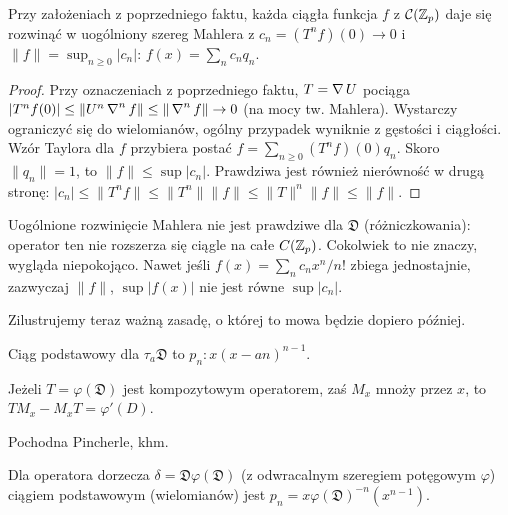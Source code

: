 \begin{fakt}
	Przy założeniach z poprzedniego faktu, każda ciągła funkcja $f$ z $\mathcal C(\mathbb Z_p)$ daje się rozwinąć w uogólniony szereg Mahlera z $c_n = (T^n f)(0) \to 0$ i $\|f\| = \sup_{n \ge 0} |c_n|$:
	$
		f(x) = \sum_{n} c_nq_n.
	$
\end{fakt}

\begin{proof}
	Przy oznaczeniach z poprzedniego faktu, $T = \operatorname{\nabla} U$ pociąga $|T^n f(0)| \le \|U^n \operatorname{\nabla}^n f\| \le \|\operatorname{\nabla}^n f\| \to 0$ (na mocy tw. Mahlera).
	Wystarczy ograniczyć się do wielomianów, ogólny przypadek wyniknie z gęstości i ciągłości.
	Wzór Taylora dla $f$ przybiera postać $f = \sum_{n \ge 0} (T^n f)(0) q_n$.
	Skoro $\|q_n\| = 1$, to $\|f\| \le \sup |c_n|$.
	Prawdziwa jest również nierówność w drugą stronę: $|c_n| \le \|T^n f\| \le \|T^n\| \|f\| \le \|T\|^n \|f\| \le \|f\|$.
\end{proof}

Uogólnione rozwinięcie Mahlera nie jest prawdziwe dla $\mathfrak D$ (różniczkowania): operator ten nie rozszerza się ciągle na całe $C(\mathbb Z_p)$.
Cokolwiek to nie znaczy, wygląda niepokojąco.
Nawet jeśli $f(x) = \sum_n c_n x^n / n!$ zbiega jednostajnie, zazwyczaj $\|f\|$, $\sup |f(x)|$ nie jest równe $\sup |c_n|$.

Zilustrujemy teraz ważną zasadę, o której to mowa będzie dopiero później.

\begin{przyklad}
	Ciąg podstawowy dla $\tau_a \mathfrak D$ to $p_n \colon x (x- an)^{n-1}$.
\end{przyklad}

\begin{lemat}
	Jeżeli $T = \varphi(\mathfrak D)$ jest kompozytowym operatorem, zaś $M_x$ mnoży przez $x$, to $TM_x - M_xT = \varphi'(D)$.
\end{lemat}

Pochodna Pincherle, khm.

\begin{fakt}
	Dla operatora dorzecza $\delta = \mathfrak D\varphi(\mathfrak D)$ (z odwracalnym szeregiem potęgowym $\varphi$) ciągiem podstawowym (wielomianów) jest $p_n = x \varphi(\mathfrak D)^{-n}(x^{n-1})$.
\end{fakt}

